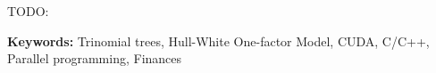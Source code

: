 TODO:

\noindent
\textbf{Keywords:}
Trinomial trees, Hull-White One-factor Model, CUDA, C/C++, Parallel programming, Finances